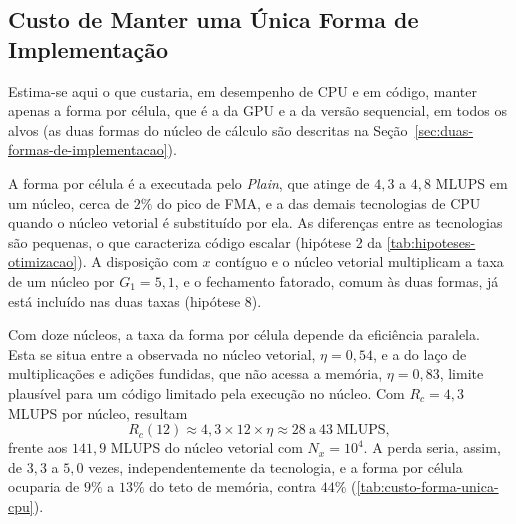 \subsection{Custo de Manter uma Única Forma de Implementação}\label{subsec:custo-forma-unica}

Estima-se aqui o que custaria, em desempenho de CPU e em código, manter apenas a forma por célula, que é a da GPU e a da versão sequencial, em todos os alvos (as duas formas do núcleo de cálculo são descritas na Seção~\ref{sec:duas-formas-de-implementacao}).

A forma por célula é a executada pelo \textit{Plain}, que atinge de \(4{,}3\) a \(4{,}8\) MLUPS em um núcleo, cerca de \(2\%\) do pico de FMA, e a das demais tecnologias de CPU quando o núcleo vetorial é substituído por ela.
As diferenças entre as tecnologias são pequenas, o que caracteriza código escalar (hipótese 2 da \autoref{tab:hipoteses-otimizacao}).
A disposição com $x$ contíguo e o núcleo vetorial multiplicam a taxa de um núcleo por \(G_1 = 5{,}1\), e o fechamento fatorado, comum às duas formas, já está incluído nas duas taxas (hipótese 8).

Com doze núcleos, a taxa da forma por célula depende da eficiência paralela.
Esta se situa entre a observada no núcleo vetorial, \(\eta = 0{,}54\), e a do laço de multiplicações e adições fundidas, que não acessa a memória, \(\eta = 0{,}83\), limite plausível para um código limitado pela execução no núcleo.
Com \(R_{c} = 4{,}3\) MLUPS por núcleo, resultam
\begin{equation}
    R_{c}(12) \approx 4{,}3 \times 12 \times \eta \approx 28\ \text{a}\ 43\ \text{MLUPS},
    \label{eq:taxa-forma-celula}
\end{equation}
frente aos \(141{,}9\) MLUPS do núcleo vetorial com \(N_x = 10^4\).
A perda seria, assim, de \(3{,}3\) a \(5{,}0\) vezes, independentemente da tecnologia, e a forma por célula ocuparia de \(9\%\) a \(13\%\) do teto de memória, contra \(44\%\) (\autoref{tab:custo-forma-unica-cpu}).

